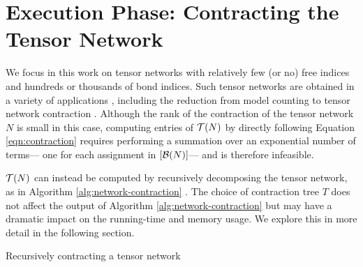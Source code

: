 \section{Execution Phase: Contracting the Tensor Network}
\label{sec:tensors:execution}
We focus in this work on tensor networks with relatively few (or no) free indices and hundreds or thousands of bond indices. Such tensor networks are obtained in a variety of applications \cite{Cichocki14,DLVR18}, including the reduction from model counting to tensor network contraction \cite{BMT15}. Although the rank of the contraction of the tensor network $N$ is small in this case, computing entries of $\mathcal{T}(N)$ by
directly following Equation \ref{eqn:contraction} requires performing a summation over an exponential number of terms--- one for each assignment in $[\mathcal{B}(N)]$--- and is therefore infeasible.

$\mathcal{T}(N)$ can instead be computed by recursively decomposing the tensor network, as in Algorithm \ref{alg:network-contraction} \cite{EP14}. The choice of contraction tree $T$ does not affect the output of Algorithm \ref{alg:network-contraction} but may have a dramatic impact on the running-time and memory usage. We explore this in more detail in the following section.

\begin{algorithm*}[t]
    \label{alg:network-contraction}
    \caption{Recursively contracting a tensor network}
    
    \DontPrintSemicolon
\end{algorithm*}
